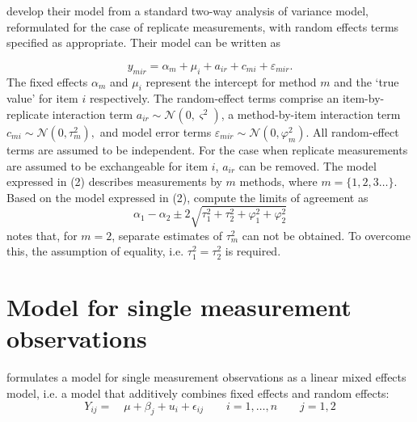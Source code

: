 \documentclass[12pt, a4paper]{report}
\theoremstyle{plain}
\theoremstyle{definition}
\theoremstyle{remark}
\begin{document}


\citet{BXC2008} develop their model from a standard two-way analysis of variance model, reformulated for the case of replicate measurements, with random effects terms specified as appropriate.
Their model can be written as

\begin{equation}\label{BXC-model}
y_{mir}  = \alpha_{m} + \mu_{i} + a_{ir} + c_{mi} + \varepsilon_{mir}.
\end{equation}
The fixed effects $\alpha_{m}$ and $\mu_{i}$ represent the intercept for method $m$ and the `true value' for item $i$ respectively. The random-effect terms comprise an item-by-replicate interaction term $a_{ir} \sim \mathcal{N}(0,\varsigma^{2})$, a method-by-item interaction term $c_{mi} \sim \mathcal{N}(0,\tau^{2}_{m}),$ and model error terms $\varepsilon_{mir} \sim \mathcal{N}(0,\varphi^{2}_{m}).$ All random-effect terms are assumed to be independent. For the case when replicate measurements are assumed to be exchangeable for item $i$, $a_{ir}$ can be removed. The model expressed in (2) describes measurements by $m$ methods, where $m = \{1,2,3\ldots\}$. Based on the model expressed in (2), \citet{BXC2008} compute the limits of agreement as
\[
\alpha_1 - \alpha_2 \pm 2 \sqrt{ \tau^2_1 +  \tau^2_2 +  \varphi^2_1 +  \varphi^2_2 }
\]
\citet{BXC2008} notes that, for $m=2$,  separate estimates of $\tau^2_m$ can not be obtained. To overcome this, the assumption of equality, i.e. $\tau^2_1 = \tau^2_2$ is required.

\section{Model for single measurement observations}
\citet{Kinsella} formulates a model for
single measurement observations as a
linear mixed effects model, i.e. a model that additively combines
fixed effects and random effects:
\[
Y_{ij} =\quad \mu + \beta_{j} + u_{i} + \epsilon_{ij} \qquad i = 1,\dots,n
\qquad j=1,2\]
\end{document}
